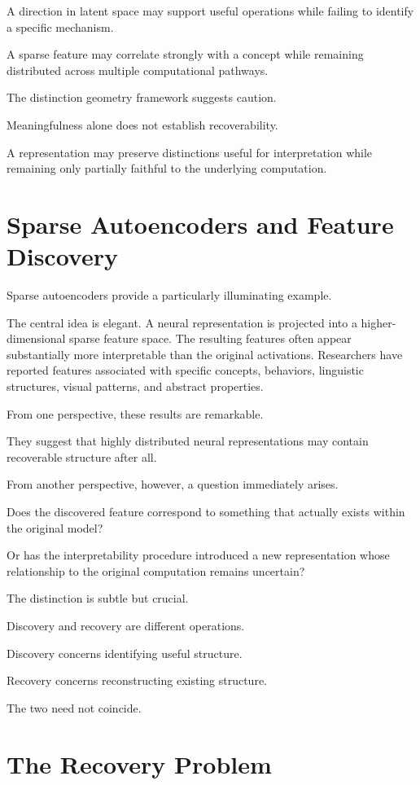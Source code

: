 \documentclass[11pt,oneside,openany]{book}
\begin{document}
A direction in latent space may support useful operations while failing to identify a specific mechanism.

A sparse feature may correlate strongly with a concept while remaining distributed across multiple computational pathways.

The distinction geometry framework suggests caution.

Meaningfulness alone does not establish recoverability.

A representation may preserve distinctions useful for interpretation while remaining only partially faithful to the underlying computation.

\section{Sparse Autoencoders and Feature Discovery}

Sparse autoencoders provide a particularly illuminating example.

The central idea is elegant. A neural representation is projected into a higher-dimensional sparse feature space. The resulting features often appear substantially more interpretable than the original activations. Researchers have reported features associated with specific concepts, behaviors, linguistic structures, visual patterns, and abstract properties.

From one perspective, these results are remarkable.

They suggest that highly distributed neural representations may contain recoverable structure after all.

From another perspective, however, a question immediately arises.

Does the discovered feature correspond to something that actually exists within the original model?

Or has the interpretability procedure introduced a new representation whose relationship to the original computation remains uncertain?

The distinction is subtle but crucial.

Discovery and recovery are different operations.

Discovery concerns identifying useful structure.

Recovery concerns reconstructing existing structure.

The two need not coincide.

\section{The Recovery Problem}
\end{document}
